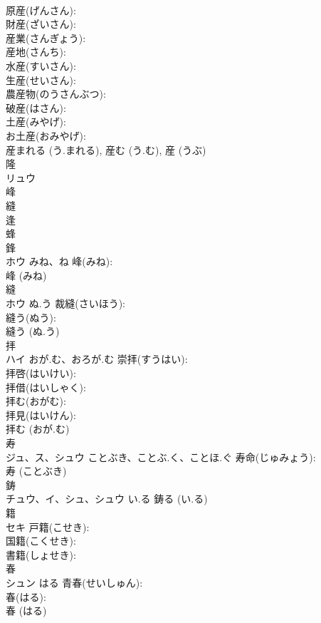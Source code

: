 \documentclass[8pt]{extreport}
\begin{document}
\begin{CJK}{UTF8}{min}
\\	原産(げんさん): 
\\	財産(ざいさん): 
\\	産業(さんぎょう): 
\\	産地(さんち): 
\\	水産(すいさん): 
\\	生産(せいさん): 
\\	農産物(のうさんぶつ): 
\\	破産(はさん): 
\\	土産(みやげ): 
\\	お土産(おみやげ): 
\\	産まれる (う.まれる), 産む (う.む), 産 (うぶ)
\\	隆			
\\	リュウ			
\\	峰			
\\	縫 
\\	逢 
\\	蜂 
\\	鋒 
\\	ホウ	みね、ね	峰(みね): 
\\	峰 (みね)
\\	縫			
\\	ホウ	ぬ.う	裁縫(さいほう): 
\\	縫う(ぬう): 
\\	縫う (ぬ.う)
\\	拝			
\\	ハイ	おが.む、おろが.む	崇拝(すうはい): 
\\	拝啓(はいけい): 
\\	拝借(はいしゃく): 
\\	拝む(おがむ): 
\\	拝見(はいけん): 
\\	拝む (おが.む)
\\	寿			
\\	ジュ、ス、シュウ	ことぶき、ことぶ.く、ことほ.ぐ	寿命(じゅみょう): 
\\	寿 (ことぶき)
\\	鋳			
\\	チュウ、イ、シュ、シュウ	い.る		鋳る (い.る)
\\	籍			
\\	セキ		戸籍(こせき): 
\\	国籍(こくせき): 
\\	書籍(しょせき): 
\\	春			
\\	シュン	はる	青春(せいしゅん): 
\\	春(はる): 
\\	春 (はる)

\end{CJK}
\end{document}
